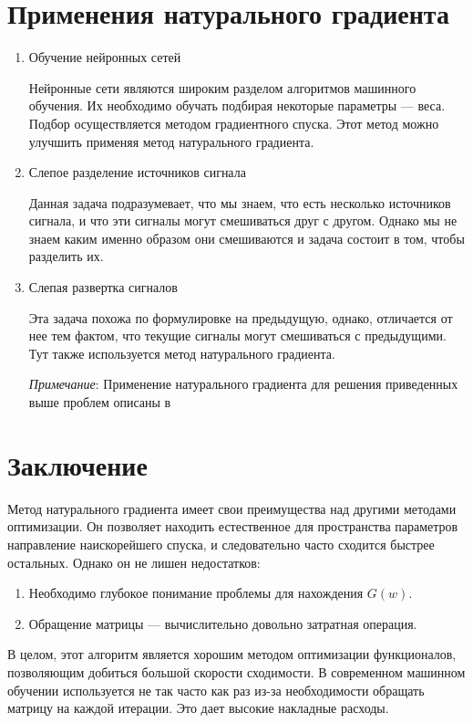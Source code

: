 \documentclass[a4paper,12pt]{article}
\begin{document}
\newpage

\section{Применения натурального градиента}
\begin{enumerate}
    \item Обучение нейронных сетей

        Нейронные сети являются широким разделом алгоритмов машинного обучения.
        Их необходимо обучать подбирая некоторые параметры --- веса. Подбор осуществляется методом градиентного спуска.
        Этот метод можно улучшить применяя метод натурального градиента.

    \item Слепое разделение источников сигнала

        Данная задача подразумевает, что мы знаем, что есть несколько источников сигнала, и что эти сигналы могут смешиваться
        друг с другом. Однако мы не знаем каким именно образом они смешиваются и задача состоит в том, чтобы разделить их.

    \item Слепая развертка сигналов

        Эта задача похожа по формулировке на предыдущую, однако, отличается от нее тем фактом, что текущие сигналы могут смешиваться
        с предыдущими. Тут также используется метод натурального градиента.

    \emph{Примечание}:
        Применение натурального градиента для решения приведенных выше проблем описаны в \cite{AmariWorks}
\end{enumerate}
\newpage
 
\section{Заключение}
Метод натурального градиента имеет свои преимущества над другими методами оптимизации. Он позволяет находить естественное для пространства параметров направление наискорейшего спуска, и следовательно часто сходится быстрее остальных. Однако он не лишен недостатков: 
\begin{enumerate}
    \item Необходимо глубокое понимание проблемы для нахождения $G(w)$. 
    \item Обращение матрицы --- вычислительно довольно затратная операция.
\end{enumerate}

В целом, этот алгоритм является хорошим методом оптимизации функционалов, позволяющим добиться большой скорости сходимости. В современном машинном обучении используется не так часто как раз из-за необходимости обращать матрицу на каждой итерации. Это дает высокие накладные расходы.
\newpage 
\end{document}
